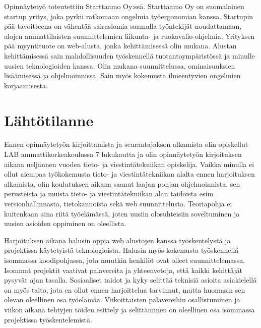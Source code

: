\documentclass[11pt,a4paper,titlepage,oneside]{article}
\begin{document}

Opinnäytetyö toteutettiin Starttaamo Oy:ssä. Starttaamo Oy on suomalainen startup yritys, joka pyrkii ratkomaan ongelmia työergonomian kanssa.
Startupin pää tavoitteena on vähentää sairaslomia saamalla työntekijät noudattamaan, alojen ammattilaisten suunnittelemien liikunta- ja ruokavalio-ohjelmia. 
% 
Yrityksen pää myyntituote on web-alusta, jonka kehittämisessä olin mukana. 
%
Alustan kehittämisessä sain mahdollisuuden työskennellä tuotantoympäristössä ja minulle uusien teknologioiden kanssa.
Olin mukana suunnittelussa, ominaisuuksien lisäämisessä ja ohjelmoinnissa. 
Sain myös kokemusta ilmeentyvien ongelmien korjaamisesta.

\medskip










\newpage
\section{Lähtötilanne}         %




Ennen opinnäytetyön kirjoittamista ja seurantajakson alkamista olin opiskellut LAB ammattikorkeakoulussa 7 lukukautta ja
olin opinnäytetyön kirjoituksen aikana neljännen vuoden tieto- ja viestintätekniikan opiskelija.
Vaikka minulla ei ollut aiempaa työkokemusta tieto- ja viestintätekniikan alalta ennen harjoituksen alkamista,
olin koulutuksen aikana saanut laajan pohjan ohjelmoinnista,
sen perusteista ja muista tieto- ja viestintätekniikan alan taidoista esim. versionhallinnasta, tietokannoista sekä web suunnittelusta.
Teoriapohja ei kuitenkaan aina riitä työelämässä, joten uusiin olosuhteisiin soveltuminen ja uusien asioiden oppiminen on oleellista.
\medskip



Harjoituksen aikana halusin oppia web alustojen kanssa työskentelystä ja projektissa käytetyistä teknologioista.
Halusin myös kokemusta työskennellä isommassa koodipohjassa, jota muutkin henkilöt ovat olleet suunnittelemassa.
Isommat projektit vaativat palavereita ja yhteenvetoja, että kaikki kehittäjät pysyvät ajan tasalla.
Sosiaaliset taidot ja kyky selittää teknisiä asioita asiakielellä on myös taito, 
jota en ollut ennen harjoittelua tarvinnut, mutta huomasin sen olevan oleellinen osa työelämää.
Viikoittaisten palavereihin osallistuminen ja viikon aikana tehtyjen töiden esittely ja selittäminen on oleellinen osa isommassa projektissa työskentelemistä.
\medskip
\end{document}
